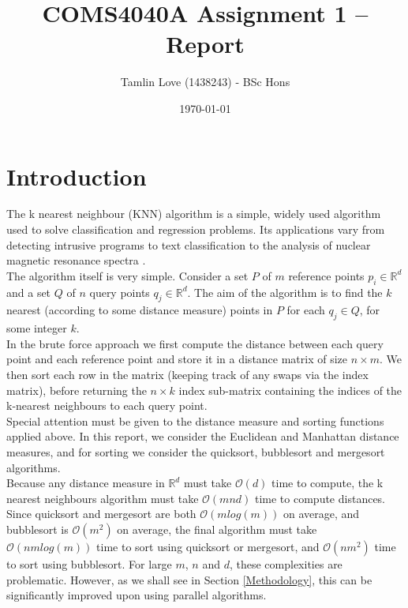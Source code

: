 \documentclass[10pt]{article}
\begin{document}
\title{COMS4040A Assignment 1 -- Report}
\author{Tamlin Love (1438243) - BSc Hons}
\date{\today} 
\maketitle 
\pagestyle{fancy}
\fancyhf{}
\fancyhead[R]{\thepage}
{} 
\vspace{-1.5cm}
\section{Introduction}\label{Introduction}
The k nearest neighbour (KNN) algorithm is a simple, widely used algorithm used to solve classification and regression problems\cite{altman92}. Its applications vary from detecting intrusive programs\cite{liao02} to text classification \cite{kwon03} to the analysis of nuclear magnetic resonance spectra \cite{kowalski72}.
\\
The algorithm itself is very simple. Consider a set $P$ of $m$ reference points $p_{i}\in\mathbb{R}^{d}$ and a set $Q$ of $n$ query points $q_{j} \in \mathbb{R}^{d}$. The aim of the algorithm is to find the $k$ nearest (according to some distance measure) points in $P$ for each $q_{j}\in Q$, for some integer $k$.
\\
In the brute force approach we first compute the distance between each query point and each reference point and store it in a distance matrix of size $n \times m$. We then sort each row in the matrix (keeping track of any swaps via the index matrix), before returning the $n \times k$ index sub-matrix containing the indices of the k-nearest neighbours to each query point.
\\
Special attention must be given to the distance measure and sorting functions applied above. In this report, we consider the Euclidean and Manhattan distance measures, and for sorting we consider the quicksort, bubblesort and mergesort algorithms.
\\
Because any distance measure in $\mathbb{R}^{d}$ must take $\mathcal{O}(d)$ time to compute, the k nearest neighbours algorithm must take $\mathcal{O}(mnd)$ time to compute distances. Since quicksort and mergesort are both $\mathcal{O}(mlog(m))$ on average, and bubblesort is $\mathcal{O}(m^2)$ on average, the final algorithm must take $\mathcal{O}(nmlog(m))$ time to sort using quicksort or mergesort, and $\mathcal{O}(nm^2)$ time to sort using bubblesort. For large $m$, $n$ and $d$, these complexities are problematic. However, as we shall see in Section \ref{Methodology}, this can be significantly improved upon using parallel algorithms.
\end{document}
